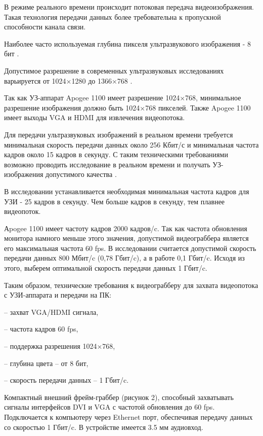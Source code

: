 В режиме реального времени происходит потоковая передача видеоизображения. Такая технология передачи данных более требовательна к пропускной способности канала связи. 

Наиболее часто используемая глубина пикселя ультразвукового изображения - 8 бит \cite{litlink2,litlink3}.

Допустимое разрешение в современных ультразвуковых исследованиях варьируется от 1024×1280 \cite{litlink4,litlink5} до 1366×768 \cite{litlink6}. 

Так как УЗ-аппарат Apogee 1100 имеет разрешение 1024×768, минимальное разрешение изображения должно быть 1024×768 пикселей. Также Apogee 1100 имеет выходы VGA и HDMI для извлечения видеопотока.

Для передачи ультразвуковых изображений в реальном времени требуется минимальная скорость передачи данных около 256 Кбит/с и минимальная частота кадров около 15 кадров в секунду. С таким техническими требованиями возможно проводить исследование в реальном времени и получать УЗ-изображения допустимого качества \cite{litlink7}.

В исследовании \cite{litlink3} устанавливается необходимая минимальная частота кадров для УЗИ - 25 кадров в секунду. Чем больше кадров в секунду, тем плавнее видеопоток. 

Аpogee 1100 имеет частоту кадров 2000 кадров/c. Так как частота обновления монитора намного меньше этого значения, допустимой видеограббера является его максимальная частота 60 fps. В исследовании \cite{litlink8} считается допустимой скорость передачи данных 800 Мбит/c (0,78 Гбит/c), а в работе \cite{litlink9} 0,1 Гбит/c. Исходя из этого, выберем оптимальной скорость передачи данных 1 Гбит/c.

Таким образом, технические требования к видеограбберу для захвата видеопотока с УЗИ-аппарата и передачи на ПК:

– захват VGA/HDMI сигнала,

– частота кадров 60 fps,

– поддержка разрешения 1024×768,

– глубина цвета – от 8 бит,

– скорость передачи данных – 1 Гбит/c.

Компактный внешний фрейм-граббер (рисунок 2), способный захватывать сигналы интерфейсов DVI и VGA с частотой обновления до 60 fps. Подключается к компьютеру через Ethernet порт, обеспечивая передачу данных со скоростью 1 Гбит/c. В устройстве имеется 3.5 мм аудиовход. 

